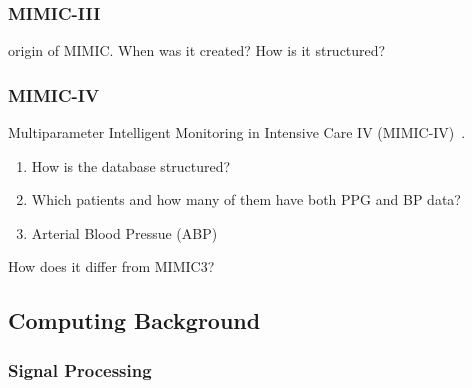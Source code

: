 \documentclass[10pt, bibliography=totoc]{scrartcl}
\begin{document}
\subsubsection{MIMIC-III}

origin of MIMIC\@.
When was it created?
How is it structured?

\subsubsection{MIMIC-IV}

Multiparameter Intelligent Monitoring in Intensive Care IV (MIMIC-IV)~\cite{johnson_mimic-iv_2023}.

\begin{enumerate}
        \item How is the database structured?
\item Which patients and how many of them have both PPG and BP data?
\item Arterial Blood Pressue (ABP)
\end{enumerate}

How does it differ from MIMIC3?

\subsection{Computing Background}

\subsubsection{Signal Processing}
\end{document}
